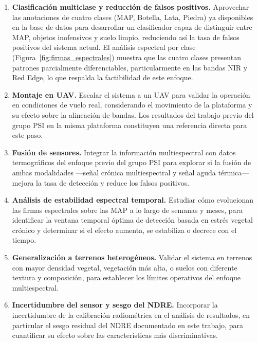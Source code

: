 \begin{enumerate}
  \item \textbf{Clasificación multiclase y reducción de falsos positivos.}
    Aprovechar las anotaciones de cuatro clases (MAP, Botella, Lata, Piedra)
    ya disponibles en la base de datos para desarrollar un clasificador capaz de
    distinguir entre \ac{MAP}, objetos inofensivos y suelo limpio, reduciendo
    así la tasa de falsos positivos del sistema actual. El análisis espectral
    por clase (Figura~\ref{fig:firmas_espectrales}) muestra que las cuatro
    clases presentan patrones parcialmente diferenciables, particularmente en
    las bandas NIR y Red Edge, lo que respalda la factibilidad de este enfoque.

  \item \textbf{Montaje en UAV.} Escalar el sistema a un \ac{UAV} para
    validar la operación en condiciones de vuelo real, considerando el
    movimiento de la plataforma y su efecto sobre la alineación de bandas.
    Los resultados del trabajo previo del grupo \ac{PSI} \cite{tenorio2024}
    en la misma plataforma constituyen una referencia directa para este paso.

  \item \textbf{Fusión de sensores.} Integrar la información multiespectral
    con datos termográficos del enfoque previo del grupo \ac{PSI}
    \cite{tenorio2024} para explorar si la fusión de ambas modalidades
    ---señal crónica multiespectral y señal aguda térmica--- mejora la
    tasa de detección y reduce los falsos positivos.

  \item \textbf{Análisis de estabilidad espectral temporal.} Estudiar cómo
    evolucionan las firmas espectrales sobre las \ac{MAP} a lo largo de
    semanas y meses, para identificar la ventana temporal óptima de detección
    basada en estrés vegetal crónico y determinar si el efecto aumenta,
    se estabiliza o decrece con el tiempo.

  \item \textbf{Generalización a terrenos heterogéneos.} Validar el sistema
    en terrenos con mayor densidad vegetal, vegetación más alta, o suelos
    con diferente textura y composición, para establecer los límites
    operativos del enfoque multiespectral.

  \item \textbf{Incertidumbre del sensor y sesgo del NDRE.} Incorporar la
    incertidumbre de la calibración radiométrica en el análisis de resultados,
    en particular el sesgo residual del \ac{NDRE} documentado en este trabajo,
    para cuantificar su efecto sobre las características más discriminativas.
\end{enumerate}
